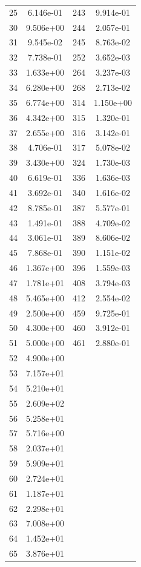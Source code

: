 \documentclass[12pt]{article}
\begin{document}
\begin{longtable}{@{}cccc@{}}
25 & 6.146e-01 & 243 & 9.914e-01 \\
30 & 9.506e+00 & 244 & 2.057e-01 \\
31 & 9.545e-02 & 245 & 8.763e-02 \\
32 & 7.738e-01 & 252 & 3.652e-03 \\
33 & 1.633e+00 & 264 & 3.237e-03 \\
34 & 6.280e+00 & 268 & 2.713e-02 \\
35 & 6.774e+00 & 314 & 1.150e+00 \\
36 & 4.342e+00 & 315 & 1.320e-01 \\
37 & 2.655e+00 & 316 & 3.142e-01 \\
38 & 4.706e-01 & 317 & 5.078e-02 \\
39 & 3.430e+00 & 324 & 1.730e-03 \\
40 & 6.619e-01 & 336 & 1.636e-03 \\
41 & 3.692e-01 & 340 & 1.616e-02 \\
42 & 8.785e-01 & 387 & 5.577e-01 \\
43 & 1.491e-01 & 388 & 4.709e-02 \\
44 & 3.061e-01 & 389 & 8.606e-02 \\
45 & 7.868e-01 & 390 & 1.151e-02 \\
46 & 1.367e+00 & 396 & 1.559e-03 \\
47 & 1.781e+01 & 408 & 3.794e-03 \\
48 & 5.465e+00 & 412 & 2.554e-02 \\
49 & 2.500e+00 & 459 & 9.725e-01 \\
50 & 4.300e+00 & 460 & 3.912e-01 \\
51 & 5.000e+00 & 461 & 2.880e-01 \\
52 & 4.900e+00 &  &  \\
53 & 7.157e+01 &  &  \\
54 & 5.210e+01 &  &  \\
55 & 2.609e+02 &  &  \\
56 & 5.258e+01 &  &  \\
57 & 5.716e+00 &  &  \\
58 & 2.037e+01 &  &  \\
59 & 5.909e+01 &  &  \\
60 & 2.724e+01 &  &  \\
61 & 1.187e+01 &  &  \\
62 & 2.298e+01 &  &  \\
63 & 7.008e+00 &  &  \\
64 & 1.452e+01 &  &  \\
65 & 3.876e+01 &  &  \\

\end{longtable}
\end{document}
